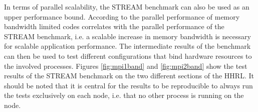 In terms of parallel scalability, the STREAM benchmark can also be used as an upper performance bound. According to \cite{petsc-web-page} the parallel performance of memory bandwidth limited codes correlates with the parallel performance of the STREAM benchmark, i.e. a scalable increase in memory bandwidth is necessary for scalable application performance. The intermediate results of the benchmark can then be used to test different configurations that bind hardware resources to the involved processes. Figures \ref{fig:mpi1band} and \ref{fig:mpi2band} show the test results of the STREAM benchmark on the two different sections of the HHRL. It should be noted that it is central for the results to be reproducible to always run the tests exclusively on each node, i.e. that no other process is running on the node. %


%    
%
%    
%
%
%    

